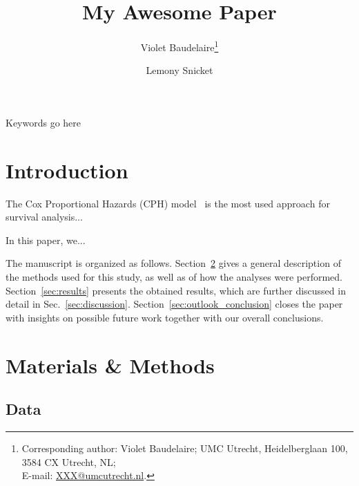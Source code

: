 \documentclass{scrartcl}
\begin{document}
\title{My Awesome Paper}
\author[a]{Violet Baudelaire\thanks{Corresponding author: Violet Baudelaire; UMC Utrecht, Heidelberglaan 100, 3584 CX Utrecht, NL; \\E-mail: \href{mailto:XXX@umcutrecht.nl}{XXX@umcutrecht.nl}.}}
\author[b]{Lemony Snicket}
\maketitle


\begin{keywords}
Keywords go here
\end{keywords}

\newpage
\section{Introduction}\label{sec:introduction}
The Cox Proportional Hazards (CPH) model~\cite{cox1972regression} is the most used approach for survival analysis...

In this paper, we...

The manuscript is organized as follows. Section~\ref{sec:materials_methods} gives a general description of the methods used for this study, as well as of how the analyses were performed. Section~\ref{sec:results} presents the obtained results, which are further discussed in detail in Sec.~\ref{sec:discussion}. Section~\ref{sec:outlook_conclusion} closes the paper with insights on possible future work together with our overall conclusions.


\newpage
\section{Materials \& Methods}\label{sec:materials_methods}

\subsection{Data}
\end{document}
